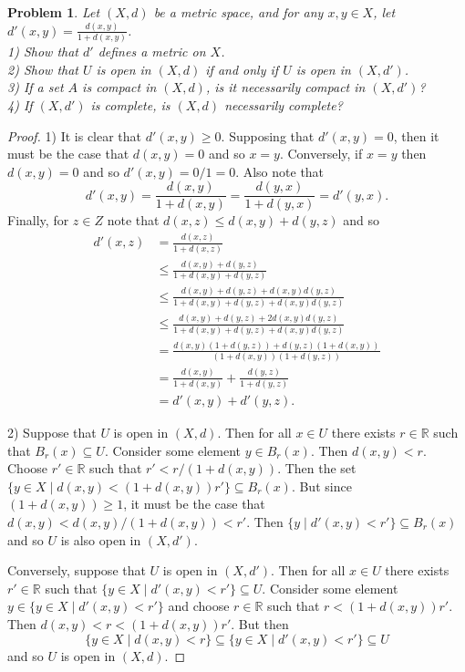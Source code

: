 \documentclass{article}
\newtheorem{problem}{Problem}
\begin{document}
\begin{flushleft}
\begin{problem}
Let $(X,d)$ be a metric space, and for any $x, y \in X$, let $d'(x,y) = \frac{d(x,y)}{1+ d(x,y)}$.\\
1) Show that $d'$ defines a metric on $X$.\\
2) Show that $U$ is open in $(X, d)$ if and only if $U$ is open in $(X, d')$.\\
3) If a set $A$ is compact in $(X, d)$, is it necessarily compact in $(X, d')$?\\
4) If $(X, d')$ is complete, is $(X, d)$ necessarily complete?
\end{problem}
\begin{proof}
1) It is clear that $d'(x,y) \geq 0$. Supposing that $d'(x,y) = 0$, then it must be the case that $d(x,y) = 0$ and so $x = y$. Conversely, if $x = y$ then $d(x,y) = 0$ and so $d'(x,y) = 0/1 = 0$. Also note that
\[
d'(x,y) = \frac{d(x,y)}{1 + d(x,y)} = \frac{d(y,x)}{1 + d(y,x)} = d'(y,x).
\]
Finally, for $z \in Z$ note that $d(x,z) \leq d(x,y) + d(y,z)$ and so
\begin{align*}
d'(x,z)
&= \frac{d(x,z)}{1 + d(x,z)}\\
&\leq \frac{d(x,y) + d(y,z)}{1 + d(x,y) + d(y,z)}\\
&\leq \frac{d(x,y) + d(y,z) + d(x,y)d(y,z)}{1 + d(x,y) + d(y,z) + d(x,y)d(y,z)}\\
&\leq \frac{d(x,y) + d(y,z) + 2d(x,y)d(y,z)}{1 + d(x,y) + d(y,z) + d(x,y)d(y,z)}\\
&= \frac{d(x,y)(1 + d(y,z)) + d(y,z)(1 + d(x,y))}{(1 + d(x,y))(1 + d(y,z))}\\
&= \frac{d(x,y)}{1 + d(x,y)} + \frac{d(y,z)}{1 + d(y,z)}\\
&= d'(x,y) + d'(y,z).
\end{align*}\newline

2) Suppose that $U$ is open in $(X, d)$. Then for all $x \in U$ there exists $r \in \mathbb{R}$ such that $B_r(x) \subseteq U$. Consider some element $y \in B_r(x)$. Then $d(x,y) < r$. Choose $r' \in \mathbb{R}$ such that $r' < r/(1 + d(x,y))$. Then the set $\{y \in X \mid d(x,y) < (1 + d(x,y)) r'\} \subseteq B_r(x)$. But since $(1 + d(x,y)) \geq 1$, it must be the case that $d(x,y) < d(x,y)/(1 + d(x,y)) < r'$. Then $\{y \mid d'(x,y) < r'\} \subseteq B_r(x)$ and so $U$ is also open in $(X, d')$.\newline

Conversely, suppose that $U$ is open in $(X, d')$. Then for all $x \in U$ there exists $r' \in \mathbb{R}$ such that $\{y \in X \mid d'(x,y) < r'\} \subseteq U$. Consider some element $y \in \{y \in X \mid d'(x,y) < r'\}$ and choose $r \in \mathbb{R}$ such that $r < (1 + d(x,y))r'$. Then $d(x,y) < r < (1 + d(x,y)) r'$. But then
\[
\{y \in X \mid d(x,y) < r\} \subseteq \{y \in X \mid d'(x,y) < r'\} \subseteq U
\]
and so $U$ is open in $(X, d)$.\newline


\end{proof}
\end{flushleft}
\end{document}
